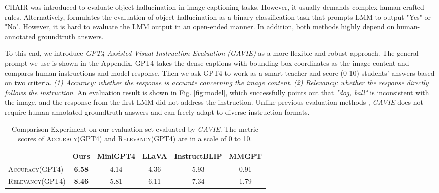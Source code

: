 CHAIR \cite{rohrbach2018object} was introduced to evaluate object hallucination in image captioning tasks. However, it 
usually demands complex human-crafted rules. Alternatively, \cite{li2023evaluating} formulates the evaluation of object hallucination as a binary classification task that prompts LMM to output "Yes" or "No". However, it is hard to evaluate the LMM output in an open-ended manner. In addition, both methods highly depend on human-annotated groundtruth answers.


To this end, we introduce \textit{GPT4-Assisted Visual Instruction Evaluation (GAVIE)} as a more flexible and robust approach. The general prompt we use is shown in %
the Appendix. GPT4 takes the dense captions with bounding box coordinates as the image content and compares human instructions and model response. Then we ask GPT4 to work as a smart teacher and score (0-10) students' answers based on two criteria. \textit{(1) Accuracy: whether the response is accurate concerning the image content}. \textit{(2) Relevancy: whether the response directly follows the instruction}. An evaluation result is shown in Fig. \ref{fig:model}, which successfully points out that \textit{"dog, ball"} is inconsistent with the image, and the response from the first LMM did not address the instruction. Unlike previous evaluation methods \cite{liu2023visual, li2023evaluating, rohrbach2018object}, \textit{GAVIE} does not require human-annotated groundtruth answers and can freely adapt to diverse instruction formats.

\begin{table}[t]
\setlength\tabcolsep{3pt}
\centering
\small
\begin{tabular}{lccccc}
\toprule[1.5pt]
& Ours & MiniGPT4 & LLaVA & InstructBLIP & MMGPT\\
\midrule
\textsc{Accuracy(GPT4)} & \textbf{6.58} & 4.14 & 4.36 & 5.93 & 0.91\\
\textsc{Relevancy(GPT4)} & \textbf{8.46} & 5.81 & 6.11 & 7.34 & 1.79\\
\bottomrule[1.5pt]
\end{tabular}
\vspace{0.05in}
\caption{
Comparison Experiment on our evaluation set evaluated by \textit{GAVIE}. The metric scores of \textsc{Accuracy(GPT4)} and \textsc{Relevancy(GPT4)} are in a scale of 0 to 10.
}
\label{tab:comparison_evaluation}
\vspace{-0.1in}
\end{table}


